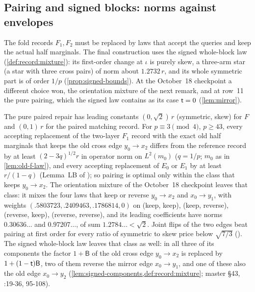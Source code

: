 \subsection{Pairing and signed blocks: norms against envelopes}\label{subsec:obs:pairing}

The fold records $F_1,F_2$ must be replaced by laws that accept the queries and
keep the actual half marginals. The final construction uses the signed
whole-block law (\cref{def:record:mixture}): its first-order change at $\iota$
is purely skew, a three-arm star (a star with three cross pairs) of norm about $1.2732\,r$, and its whole
symmetric part is of order $1/p$ (\cref{prop:signed-bounds}). At the
October~18 checkpoint a different choice won, the orientation mixture of the
next remark, and at row~11 the pure pairing, which the signed law contains as
its case $\mathsf t=0$ (\cref{lem:mirror}).

\begin{remark}\label{rem:record:pairing-barrier}
The pure paired repair has leading constants $(0,\sqrt2)\,r$ (symmetric, skew)
for $F$ and $(0,1)\,r$ for the paired matching record. For $p\equiv3\pmod4$,
$p\ge43$, every accepting replacement of the two-layer $F_1$ record with the
exact old half marginals that keeps the old cross edge $y_0\to x_2$ differs from
the reference record by at least $(2-3q)^{1/2}r$ in operator norm on $L^2(m_0)$ ($q=1/p$; $m_0$ as in \cref{lem:old-f-law}),
and every accepting replacement of $E_0$ or $E_1$ by at least $r/(1-q)$ (Lemma~LB
of ); so
pairing is optimal only within the class that keeps $y_0\to x_2$. The orientation mixture
of the October~18 checkpoint leaves that class: it mixes the four laws that keep
or reverse $y_0\to x_2$ and $x_0\to y_1$, with weights
$(.5803723,.2409463,.1786814,0)$ on (keep, keep), (keep, reverse),
(reverse, keep), (reverse, reverse), and its leading coefficients have norms
$0.30636\ldots$ and $0.97207\ldots$, of sum $1.2784\ldots<\sqrt2$. Joint flips
of the two edges beat pairing at first order for every ratio of symmetric to
skew price below $\sqrt{7/3}$
().
The signed whole-block law leaves that class as well: in all three of its
components the factor $1+\mathsf B$ of the old cross edge $y_0\to x_2$ is replaced by $1+(1-\mathsf t)\mathsf B$, two of them reverse the mirror edge $x_0\to y_1$, and
one of these also the old edge $x_0\to y_2$
(\cref{lem:signed-components,def:record:mixture}; master \S43,
:19-36, 95-108).
\end{remark}


